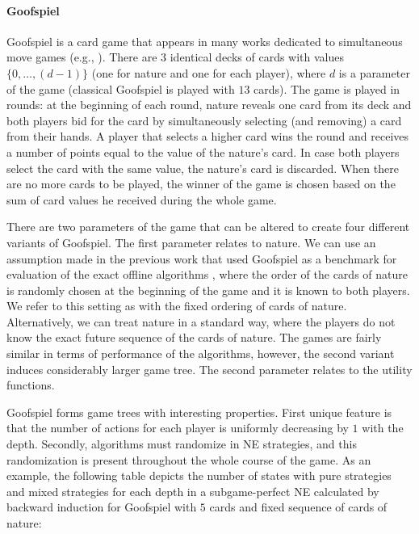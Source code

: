\paragraph{\textbf{Goofspiel}}
Goofspiel is a card game that appears in many works dedicated to simultaneous move games (e.g., \cite{Ross71Goofspiel,Rhoads12Computer,Saffidine12SMAB,Lanctot13Goofspiel}).
There are $3$ identical decks of cards with values $\{0,\dots, (d-1)\}$ (one for nature and one for each player), where $d$ is a parameter of the game (classical Goofspiel is played with $13$ cards).
The game is played in rounds: at the beginning of each round, nature reveals one card from its deck and both players bid for the card by simultaneously selecting (and removing) a card from their hands.
A player that selects a higher card wins the round and receives a number of points equal to the value of the nature's card.
In case both players select the card with the same value, the nature's card is discarded.
When there are no more cards to be played, the winner of the game is chosen based on the sum of card values he received during the whole game.

There are two parameters of the game that can be altered to create four different variants of Goofspiel.
The first parameter relates to nature.
We can use an assumption made in the previous work that used Goofspiel as a benchmark for evaluation of the exact offline algorithms \cite{Saffidine12SMAB}, where the order of the cards of nature is randomly chosen at the beginning of the game and it is known to both players.
We refer to this setting as with the fixed ordering of cards of nature.
Alternatively, we can treat nature in a standard way, where the players do not know the exact future sequence of the cards of nature.
The games are fairly similar in terms of performance of the algorithms, however, the second variant induces considerably larger game tree.
The second parameter relates to the utility functions.

Goofspiel forms game trees with interesting properties.
First unique feature is that the number of actions for each player is uniformly decreasing by $1$ with the depth.
Secondly, algorithms must randomize in NE strategies, and this randomization is present throughout the whole course of the game.
As an example, the following table depicts the number of states with pure strategies and mixed strategies for each depth in a subgame-perfect NE calculated by backward induction for Goofspiel with $5$ cards and fixed sequence of cards of nature:


